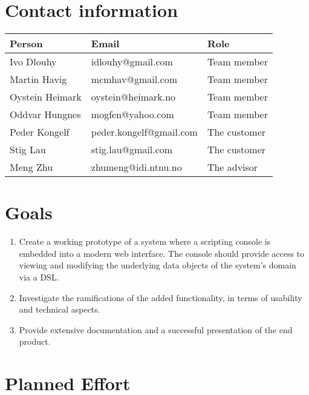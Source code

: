 \section{Contact information}
\begin{tabular}{ | l | l | l | }
  \hline
  \textbf{Person} & \textbf{Email} & \textbf{Role} \\ \hline
  Ivo Dlouhy & idlouhy@gmail.com & Team member \\ \hline
  Martin Havig & mcmhav@gmail.com & Team member \\ \hline
  Oystein Heimark & oystein@heimark.no & Team member \\ \hline
  Oddvar Hungnes & mogfen@yahoo.com & Team member \\ \hline
  Peder Kongelf & peder.kongelf@gmail.com & The customer \\ \hline
  Stig Lau & stig.lau@gmail.com & The customer \\ \hline
  Meng Zhu & zhumeng@idi.ntnu.no & The advisor \\ \hline
\end{tabular}


\section{Goals}
\begin{enumerate}
  \item Create a working prototype of a system where a scripting console is embedded into a modern web interface. The console should provide access to viewing and modifying the underlying data objects of the system's domain via a DSL.
  \item Investigate the ramifications of the added functionality, in terms of usability and technical aspects.
  \item Provide extensive documentation and a successful presentation of the end product.
\end{enumerate}

\section{Planned Effort}
